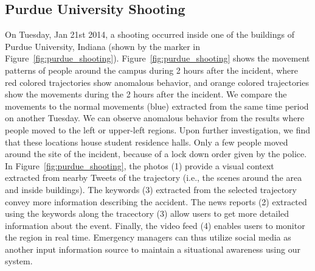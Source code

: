 \subsection{Purdue University Shooting}
On Tuesday, Jan 21st 2014, a shooting occurred inside one of the buildings of Purdue University, Indiana (shown by the marker in Figure~\ref{fig:purdue_shooting}).
Figure~\ref{fig:purdue_shooting} shows the movement patterns of people around the campus during 2 hours after the incident, where red colored trajectories show anomalous behavior, and orange colored trajectories show the movements during the 2 hours after the incident.
We compare the movements to the normal movements (blue) extracted from the same time period on another Tuesday.
We can observe anomalous behavior from the results where people moved to the left or upper-left regions.  Upon further investigation, we find that these locations house student residence halls.
Only a few people moved around the site of the incident, because of a lock down order given by the police.
In Figure~\ref{fig:purdue_shooting}, the photos (1) provide a visual context extracted from nearby Tweets of the trajectory (i.e., the scenes around the area and inside buildings).
The keywords (3) extracted from the selected trajectory convey more information describing the accident.
The news reports (2) extracted using the keywords along the tracectory (3) allow users to get more detailed information about the event.
Finally, the video feed (4) enables users to monitor the region in real time. 
Emergency managers can thus utilize social media as another input information source to maintain a situational awareness using our system.